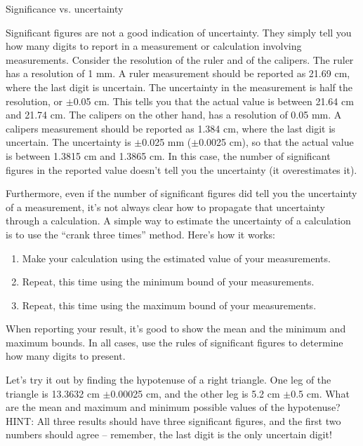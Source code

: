 \documentclass[11pt,letterpaper]{article}
\newcounter{question}[section]
\begin{document}
\question{} Significance vs. uncertainty

Significant figures are not a good indication of uncertainty. They simply tell you how many digits to report in a measurement or calculation involving measurements. Consider the resolution of the ruler and of the calipers. The ruler has a resolution of 1 mm. A ruler measurement should be reported as 21.69 cm, where the last digit is uncertain. The uncertainty in the measurement is half the resolution, or $\pm$0.05 cm. This tells you that the actual value is between 21.64 cm and 21.74 cm. The calipers on the other hand, has a resolution of 0.05 mm. A calipers measurement should be reported as 1.384 cm, where the last digit is uncertain. The uncertainty is $\pm$0.025 mm ($\pm$0.0025 cm), so that the actual value is between 1.3815 cm and 1.3865 cm. In this case, the number of significant figures in the reported value doesn't tell you the uncertainty (it overestimates it). 

Furthermore, even if the number of significant figures did tell you the uncertainty of a measurement, it's not always clear how to propagate that uncertainty through a calculation. A simple way to estimate the uncertainty of a calculation is to use the ``crank three times'' method. Here's how it works:
\begin{enumerate}
\item Make your calculation using the estimated value of your measurements.
\item Repeat, this time using the minimum bound of your measurements.
\item Repeat, this time using the maximum bound of your measurements.
\end{enumerate}
When reporting your result, it's good to show the mean and the minimum and maximum bounds. In all cases, use the rules of significant figures to determine how many digits to present.

Let's try it out by finding the hypotenuse of a right triangle. One leg of the triangle is 13.3632 cm $\pm$0.00025 cm, and the other leg is 5.2 cm $\pm$0.5 cm. What are the mean and maximum and minimum possible values of the hypotenuse? HINT: All three results should have three significant figures, and the first two numbers should agree -- remember, the last digit is the only uncertain digit!
\vspace{10cm}
\end{document}
